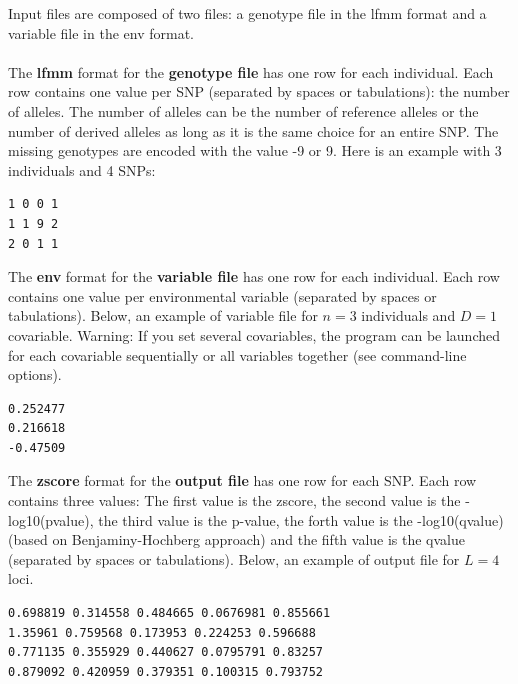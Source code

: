 \documentclass[10pt,a4paper]{article}
\begin{document}
Input files are composed of two files: a genotype file in the lfmm format and a variable file in the env format. 
\\
\\
The {\bf lfmm} format for the {\bf genotype file} has one row for each individual. Each row contains
one value per SNP (separated by spaces or tabulations): the number of alleles.
The number of alleles can be the number of reference alleles or the number
of derived alleles as long as it is the same choice for an entire SNP. The missing
genotypes are encoded with the value -9 or 9.
Here is an example with 3 individuals and 4 SNPs:
\begin{center}
\begin{Verbatim}[frame=single]
1 0 0 1
1 1 9 2
2 0 1 1
\end{Verbatim}
\end{center}

\noindent
The {\bf env} format for the {\bf variable file} has one row for each individual. 
Each row contains one value per environmental variable
(separated by spaces or tabulations).
Below, an example of variable file for $n=3$ individuals and $D=1$ covariable.
Warning: If you set several covariables, the program can be launched for each covariable sequentially
or all variables together (see command-line options).

\begin{center}
\begin{Verbatim}[frame=single]
0.252477
0.216618
-0.47509
\end{Verbatim}
\end{center}

\noindent
The {\bf zscore} format for the {\bf output file}
has one row for each SNP. Each row contains three values: The first value is the zscore, the second value is the -log10(pvalue), the third value is the p-value, the forth value is the -log10(qvalue) (based on Benjaminy-Hochberg approach) and the fifth value is the qvalue (separated by spaces or tabulations).
Below, an example of output file for $L=4$ loci.

\begin{center}
\footnotesize
\begin{Verbatim}[frame=single]
0.698819 0.314558 0.484665 0.0676981 0.855661
1.35961 0.759568 0.173953 0.224253 0.596688
0.771135 0.355929 0.440627 0.0795791 0.83257
0.879092 0.420959 0.379351 0.100315 0.793752
\end{Verbatim}
\end{center}
\end{document}
